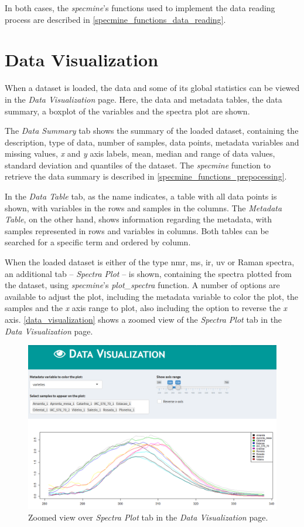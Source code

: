 In both cases, the \textit{specmine}'s functions used to implement the data reading process are described in \autoref{specmine_functions_data_reading}.


\section{Data Visualization}

When a dataset is loaded, the data and some of its global statistics can be viewed in the \textit{Data Visualization} page. Here, the data and metadata tables, the data summary, a boxplot of the variables and the spectra plot are shown. 

The \textit{Data Summary} tab shows the summary of the loaded dataset, containing the description, type of data, number of samples, data points, metadata variables and missing values, \textit{x} and \textit{y} axis labels, mean, median and range of data values, standard deviation and quantiles of the dataset. The \textit{specmine} function to retrieve the data summary is described in \autoref{specmine_functions_prepocessing}.

In the \textit{Data Table} tab, as the name indicates, a table with all data points is shown, with variables in the rows and samples in the columns. The \textit{Metadata Table}, on the other hand, shows information regarding the metadata, with samples represented in rows and variables in columns. Both tables can be searched for a specific term and ordered by column.

When the loaded dataset is either of the type \gls{nmr}, \gls{ms}, \gls{ir}, \gls{uv} or Raman spectra, an additional tab -- \textit{Spectra Plot} -- is shown, containing the spectra plotted from the dataset, using \textit{specmine}'s \textit{plot\_spectra} function. A number of options are available to adjust the plot, including the metadata variable to color the plot, the samples and the \textit{x} axis range to plot, also including  the option to reverse the \textit{x} axis.  \autoref{data_visualization} shows a zoomed view of the \textit{Spectra Plot} tab in the \textit{Data Visualization} page.

\begin{figure}[h]
	\centering
	\includegraphics[width=0.9\linewidth]{Imagens/data_visualization}
	\caption{Zoomed view over \textit{Spectra Plot} tab in the \textit{Data Visualization} page.}
	\label{data_visualization}
\end{figure}

